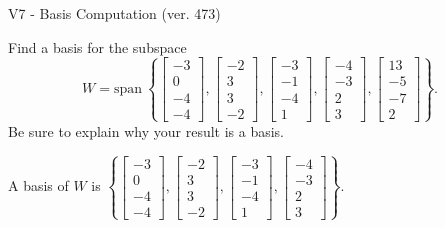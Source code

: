 \begin{exercise}
  \begin{exerciseTitle}V7 - Basis Computation (ver. 473)\end{exerciseTitle}
  \begin{exerciseStatement}
    Find a basis for the subspace 
\[W=\mathrm{span}\ \left\{\left[\begin{array}{r}
-3 \\
0 \\
-4 \\
-4
\end{array}\right] , \left[\begin{array}{r}
-2 \\
3 \\
3 \\
-2
\end{array}\right] , \left[\begin{array}{r}
-3 \\
-1 \\
-4 \\
1
\end{array}\right] , \left[\begin{array}{r}
-4 \\
-3 \\
2 \\
3
\end{array}\right] , \left[\begin{array}{r}
13 \\
-5 \\
-7 \\
2
\end{array}\right]\right\}.\]
 Be sure to explain why your result is a basis.


  \end{exerciseStatement}
  \begin{exerciseAnswer}
   A basis of \(W\) is  \(\left\{\left[\begin{array}{r}
-3 \\
0 \\
-4 \\
-4
\end{array}\right] , \left[\begin{array}{r}
-2 \\
3 \\
3 \\
-2
\end{array}\right] , \left[\begin{array}{r}
-3 \\
-1 \\
-4 \\
1
\end{array}\right] , \left[\begin{array}{r}
-4 \\
-3 \\
2 \\
3
\end{array}\right]\right\}\).
  


  \end{exerciseAnswer}
\end{exercise}